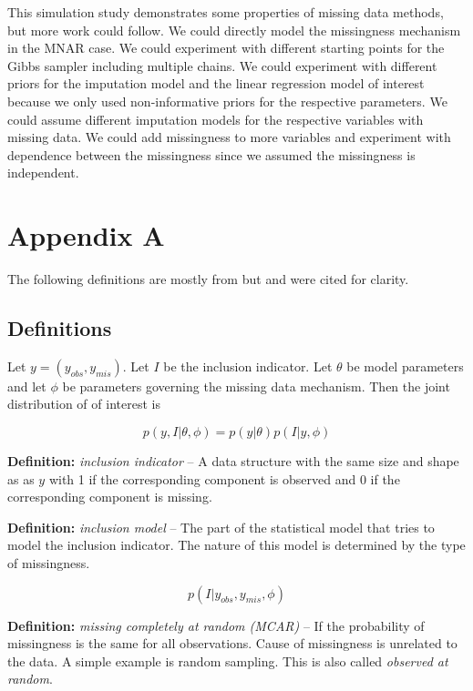\documentclass[11pt]{article}
\begin{document}
This simulation study demonstrates some properties of missing data methods, but more work could follow. We could directly model the missingness mechanism in the MNAR case. We could experiment with different starting points for the Gibbs sampler including multiple chains. We could experiment with different priors for the imputation model and the linear regression model of interest because we only used non-informative priors for the respective parameters. We could assume different imputation models for the respective variables with missing data. We could add missingness to more variables and experiment with dependence between the missingness since we assumed the missingness is independent.  

\newpage
\section{Appendix A}

The following definitions are mostly from \cite{gelman2021} but \cite{little2020} and \cite{vanBurren2018} were cited for clarity. 

\subsection{Definitions}

Let $y = (y_{obs}, y_{mis})$. Let $I$ be the inclusion indicator. Let $\theta$ be model parameters and let $\phi$ be parameters governing the missing data mechanism. Then the joint distribution of of interest is 

$$p(y, I|\theta, \phi) = p(y|\theta)p(I|y, \phi)$$

\vspace{0.25in}

\textbf{Definition:} \textit{inclusion indicator} -- A data structure with the same size and shape as as $y$ with 1 if the corresponding component is observed and 0 if the corresponding component is missing.

\vspace{0.25in}

\textbf{Definition:} \textit{inclusion model} -- The part of the statistical model that tries to model the inclusion indicator. The nature of this model is determined by the type of missingness. 

$$p(I|y_{obs}, y_{mis}, \phi)$$

\vspace{0.25in}

\textbf{Definition:} \textit{missing completely at random (MCAR)} -- If the probability of missingness is the same for all observations. Cause of missingness is unrelated to the data. A simple example is random sampling. This is also called \textit{observed at random}.
\end{document}
